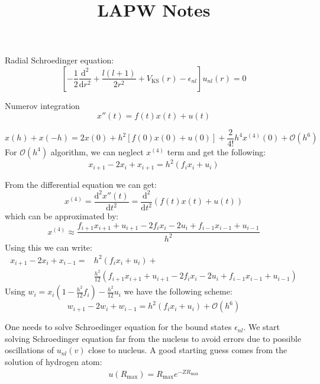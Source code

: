 \documentclass[b5paper,11pt,english]{article} %
\begin{document}
\title{%
LAPW Notes
}
\author{}
\date{}
\maketitle

Radial Schroedinger equation:
\begin{equation}
\left[ -\frac{1}{2}
\frac{\mathrm{d}^2}{\mathrm{d}r^2} +
\frac{l(l+1)}{2r^2} + V_{\mathrm{KS}}(r) - \epsilon_{nl}
\right] u_{nl}(r) = 0
\end{equation}

Numerov integration
\begin{equation}
x''(t) = f(t) x(t) + u(t)
\end{equation}


\begin{equation}
x(h) + x(-h) = 2x(0) + h^2\left[ f(0)x(0) + u(0) \right] +
\frac{2}{4!}h^4 x^{(4)}(0) + \mathcal{O}(h^6)
\end{equation}
For $\mathcal{O}(h^4)$ algorithm, we can neglect $x^{(4)}$ term and get
the following:
\begin{equation}
x_{i+1} - 2x_{i} + x_{i+1} = h^2 ( f_{i} x_{i} + u_{i} )
\end{equation}

From the differential equation we can get:
\begin{equation}
x^{(4)} = \frac{\mathrm{d}^2 x''(t)}{\mathrm{d}t^2} =
\frac{\mathrm{d}^2}{\mathrm{d}t^2} ( f(t) x(t) + u(t) ) 
\end{equation}
which can be approximated by:
\begin{equation}
x^{(4)} \approx \frac{f_{i+1} x_{i+1} + u_{i+1} - 2f_{i} x_{i} - 2u_{i} + f_{i-1}x_{i-1} + u_{i-1}}{h^2}
\end{equation}
Using this we can write:
\begin{align}
x_{i+1} - 2x_{i} + x_{i-1} = & h^2 \left( f_{i}x_{i} + u_{i} \right) + \\
& \frac{h^2}{12} \left( f_{i+1}x_{i+1} + u_{i+1} - 2f_{i}x_{i} - 2u_{i} +
f_{i-1}x_{i-1} + u_{i-1}
\right)
\end{align}
Using $w_{i} = x_{i}\left( 1 - \frac{h^2}{12}f_{i} \right) - \frac{h^2}{12}u_{i}$
we have the following scheme:
\begin{equation}
w_{i+1} - 2w_{i} + w_{i-1} = h^2 \left( f_{i} x_{i} + u_{i} \right) + 
\mathcal{O}(h^6)
\end{equation}

One needs to solve Schroedinger equation for the bound states $\epsilon_{nl}$.
We start solving Schroedinger equation far from the nucleus to avoid errors due to
possible oscillations of $u_{nl}(v)$ close to nucleus.
A good starting guess comes from the solution of hydrogen atom:
\begin{align}
u(R_{\mathrm{max}}) = R_{\mathrm{max}}e^{-ZR_{\mathrm{max}}}
\end{align}
\end{document}
